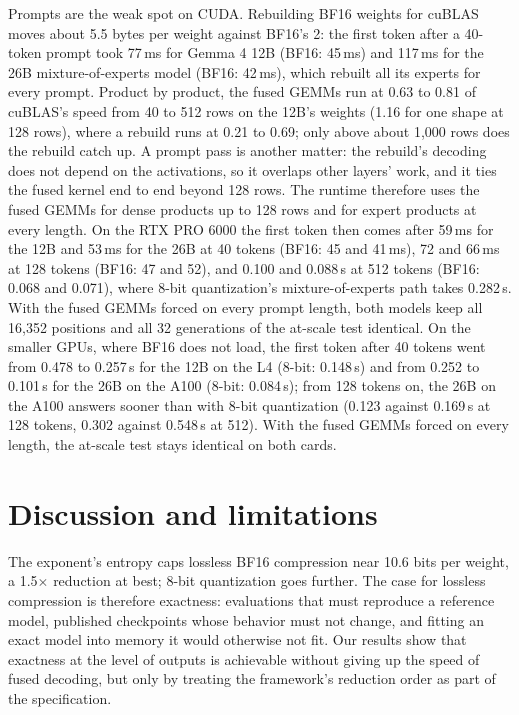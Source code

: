 \documentclass[11pt]{article}
\newcommand{\x}{$\times$}
\begin{document}
Prompts are the weak spot on CUDA. Rebuilding BF16 weights for cuBLAS moves about 5.5 bytes per weight against BF16's 2: the first token after a 40-token prompt took 77\,ms for Gemma 4 12B (BF16: 45\,ms) and 117\,ms for the 26B mixture-of-experts model (BF16: 42\,ms), which rebuilt all its experts for every prompt. Product by product, the fused GEMMs run at 0.63 to 0.81 of cuBLAS's speed from 40 to 512 rows on the 12B's weights (1.16 for one shape at 128 rows), where a rebuild runs at 0.21 to 0.69; only above about 1,000 rows does the rebuild catch up. A prompt pass is another matter: the rebuild's decoding does not depend on the activations, so it overlaps other layers' work, and it ties the fused kernel end to end beyond 128 rows. The runtime therefore uses the fused GEMMs for dense products up to 128 rows and for expert products at every length. On the RTX PRO 6000 the first token then comes after 59\,ms for the 12B and 53\,ms for the 26B at 40 tokens (BF16: 45 and 41\,ms), 72 and 66\,ms at 128 tokens (BF16: 47 and 52), and 0.100 and 0.088\,s at 512 tokens (BF16: 0.068 and 0.071), where 8-bit quantization's mixture-of-experts path takes 0.282\,s. With the fused GEMMs forced on every prompt length, both models keep all 16,352 positions and all 32 generations of the at-scale test identical. On the smaller GPUs, where BF16 does not load, the first token after 40 tokens went from 0.478 to 0.257\,s for the 12B on the L4 (8-bit: 0.148\,s) and from 0.252 to 0.101\,s for the 26B on the A100 (8-bit: 0.084\,s); from 128 tokens on, the 26B on the A100 answers sooner than with 8-bit quantization (0.123 against 0.169\,s at 128 tokens, 0.302 against 0.548\,s at 512). With the fused GEMMs forced on every length, the at-scale test stays identical on both cards.

\section{Discussion and limitations}
\label{sec:discussion}

The exponent's entropy caps lossless BF16 compression near 10.6 bits per weight, a 1.5\x{} reduction at best; 8-bit quantization goes further. The case for lossless compression is therefore exactness: evaluations that must reproduce a reference model, published checkpoints whose behavior must not change, and fitting an exact model into memory it would otherwise not fit. Our results show that exactness at the level of outputs is achievable without giving up the speed of fused decoding, but only by treating the framework's reduction order as part of the specification.
\end{document}
